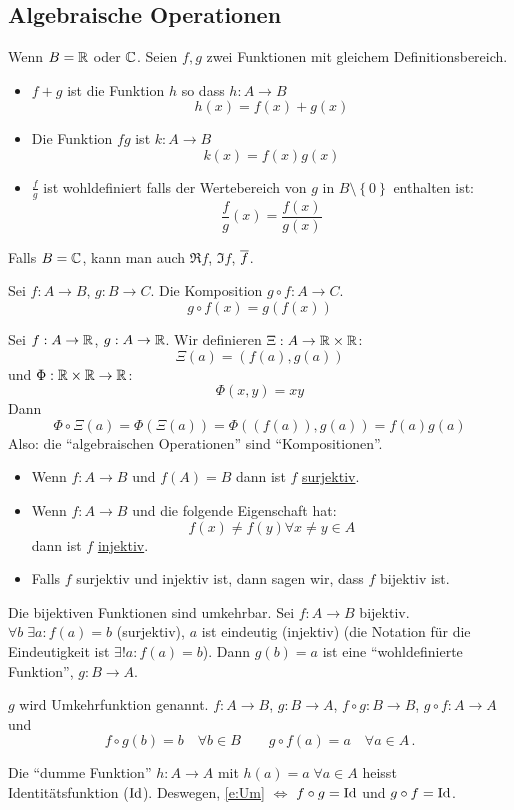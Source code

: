 \subsection{Algebraische Operationen}
Wenn $B=\mathbb{R}$ oder $\mathbb{C}$. Seien $f,g$ zwei Funktionen mit gleichem Definitionsbereich.
\begin{itemize}
  \item $f+g$ ist die Funktion $h$ so dass $h:A\to B$ \[h(x)=f(x) + g(x)\]
  \item Die Funktion $fg$ ist $k:A\to B$ \[k(x)=f(x)g(x)\]
  \item $\frac{f}{g}$ ist wohldefiniert falls der Wertebereich von $g$ in 
$B\setminus \left\{ 0 \right\}$ enthalten ist: \[\frac{f}{g}(x)=\frac{f(x)}{g(x)}\]
\end{itemize}
Falls $B=\mathbb{C}$, kann man auch $\Re f$, $\Im f$, $\overline{f}$.
\begin{Def}
  Sei $f:A\to B$, $g:B\to C$. Die Komposition $g\circ f: A\to C$.
  \[g\circ f(x)=g(f(x))\]
\end{Def}
\begin{Bem} Sei
  $f:A\to\mathbb{R}$, $g:A\to \mathbb{R}$. Wir definieren $\Xi:A\to\mathbb{R}\times\mathbb{R}$:
  \[\Xi(a)=(f(a),g(a))\]
und $\Phi:\mathbb{R}\times\mathbb{R}\to\mathbb{R}$:
$$
\Phi(x,y)=xy
$$
Dann
$$
\Phi\circ\Xi(a)=\Phi(\Xi(a))=\Phi\left( \left( f(a) \right),g(a) \right)=f(a)g(a)
$$
Also: die ``algebraischen Operationen'' sind ``Kompositionen''.
\end{Bem}
\begin{Def}
  \begin{itemize}
    \item Wenn $f:A\to B$ und $f(A)=B$ dann ist $f$ \ul{surjektiv}.
    \item Wenn $f:A\to B$ und die folgende Eigenschaft hat:
      \[f(x)\neq f(y)\forall x\neq y\in A\]
      dann ist $f$ \ul{injektiv}.
    \item Falls $f$ surjektiv und injektiv ist, dann sagen wir, dass $f$ bijektiv ist.
  \end{itemize}
\end{Def}
\begin{Bem}
  Die bijektiven Funktionen sind umkehrbar. Sei $f:A\to B$ bijektiv. $\forall b\;\exists a:f(a)=b$ (surjektiv), $a$ ist eindeutig (injektiv) (die Notation f\"ur die Eindeutigkeit ist $\exists! a:f(a)=b$). 
Dann $g(b)=a$ ist eine ``wohldefinierte Funktion'', $g:B\to A$.
\end{Bem}
\begin{Def}
  $g$ wird Umkehrfunktion genannt. $f:A\to B$, $g:B\to A$, $f\circ g: B\to B$,
$g\circ f:A\to A$ und
\begin{equation}\label{e:Um}
f\circ g(b)=b \quad \forall b\in B \qquad  g\circ f(a)=a\quad\forall a\in A\, .
\end{equation}
\end{Def}
\begin{Def}
  Die ``dumme Funktion'' $h:A\to A$ mit $h(a)=a\;\forall a\in A$ heisst Identitätsfunktion ($\operatorname{Id}$). 
Deswegen, \eqref{e:Um} $\iff$ $f\circ g=\operatorname{Id}$ und $g\circ f = \operatorname{Id}$.
\end{Def}
